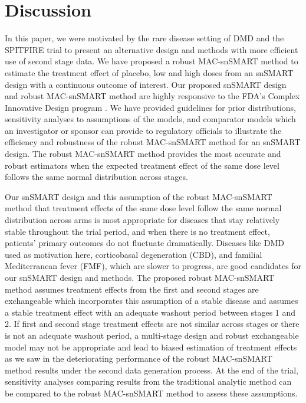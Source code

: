 \section{Discussion} \label{s:discuss}
In this paper, we were motivated by the rare disease setting of \ac{DMD} and the SPITFIRE trial to present an alternative design and methods with more efficient use of second stage data. We have proposed a robust \ac{MAC}-snSMART method to estimate the treatment effect of placebo, low and high doses from an \ac{snSMART} design with a continuous outcome of interest. Our proposed \ac{snSMART} design and robust \ac{MAC}-snSMART method are highly responsive to the \ac{FDA}'s Complex Innovative Design program \citep{fdaCID}. We have provided guidelines for prior distributions, sensitivity analyses to assumptions of the models, and comparator models which an investigator or sponsor can provide to regulatory officials to illustrate the efficiency and robustness of the robust \ac{MAC}-snSMART method for an \ac{snSMART} design. The robust \ac{MAC}-snSMART method provides the most accurate and robust estimators when the expected treatment effect of the same dose level follows the same normal distribution across stages. 

Our \ac{snSMART} design and this assumption of the robust \ac{MAC}-snSMART method that treatment effects of the same dose level follow the same normal distribution across arms is most appropriate for diseases that stay relatively stable throughout the trial period, and when there is no treatment effect, patients' primary outcomes do not fluctuate dramatically. Diseases like \ac{DMD} used as motivation here, corticobasal degeneration (CBD), and familial Mediterranean fever (FMF), which are slower to progress, are good candidates for our \ac{snSMART} design and methods. The proposed robust \ac{MAC}-snSMART method assumes treatment effects from the first and second stages are exchangeable which incorporates this assumption of a stable disease and assumes a stable treatment effect with an adequate washout period between stages 1 and 2. If first and second stage treatment effects are not similar across stages or there is not an adequate washout period, a multi-stage design and robust exchangeable model may not be appropriate and lead to biased estimation of treatment effects as we saw in the deteriorating performance of the robust \ac{MAC}-snSMART method results under the second data generation process. At the end of the trial, sensitivity analyses comparing results from the traditional analytic method can be compared to the robust \ac{MAC}-snSMART method to assess these assumptions. 

